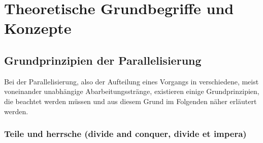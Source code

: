 
\chapter{Theoretische Grundbegriffe und Konzepte}

	\section{Grundprinzipien der Parallelisierung}
	
		Bei der Parallelisierung, also der Aufteilung eines Vorgangs in verschiedene, meist voneinander unabhängige Abarbeitungsstränge, existieren einige Grundprinzipien, die beachtet werden müssen und aus diesem Grund im Folgenden näher erläutert werden.	
	
		\subsection{Teile und herrsche (divide and conquer, divide et impera)}
			\label{TeileUndHerrsche}
	
